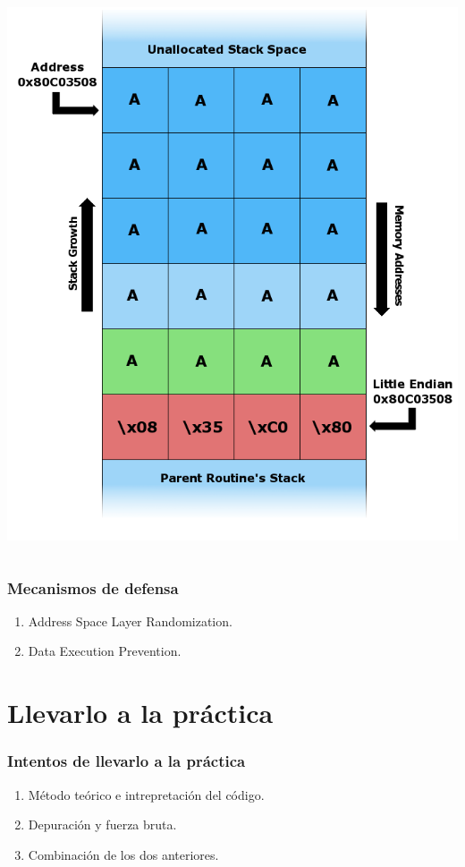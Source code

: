 \documentclass{beamer}
\begin{document}
\begin{frame}
\begin{columns}[t]
\begin{column}[T]{6cm}
         \includegraphics[scale=0.2]{Stack_Overflow_4.png}
     \end{column}
     \end{columns}
\end{frame}

\begin{frame}
\frametitle{Mecanismos de defensa}
\begin{enumerate}
	\item Address Space Layer Randomization.
	\item Data Execution Prevention.
\end{enumerate}
\end{frame}

\section{Llevarlo a la pr\'actica}

\begin{frame}
\frametitle{Intentos de llevarlo a la pr\'actica}
\begin{enumerate}
	\item M\'etodo te\'orico e intrepretaci\'on del c\'odigo.
	\item Depuraci\'on y fuerza bruta.
	\item Combinaci\'on de los dos anteriores.
\end{enumerate}
\end{frame}
\end{document}
